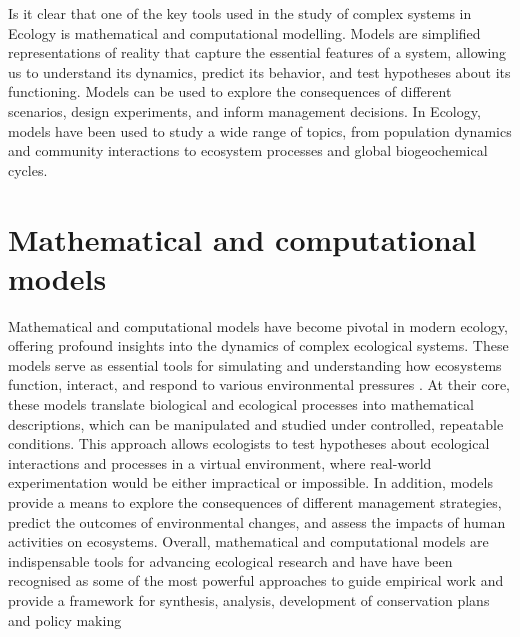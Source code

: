 Is it clear that one of the key tools used in the study of complex systems in
Ecology is mathematical and computational modelling. Models are simplified
representations of reality that capture the essential features of a system,
allowing us to understand its dynamics, predict its behavior, and test
hypotheses about its functioning. Models can be used to explore the
consequences of different scenarios, design experiments, and inform management
decisions. In Ecology, models have been used to study a wide range of topics,
from population dynamics and community interactions to ecosystem processes and
global biogeochemical cycles.

\section{\label{sec:Mathematical and computational models} Mathematical and
  computational models}

Mathematical and computational models have become pivotal in modern ecology,
offering profound insights into the dynamics of complex ecological systems.
These models serve as essential tools for simulating and understanding how
ecosystems function, interact, and respond to various environmental pressures
\cite{HOCH19983}. At their core, these models translate biological and
ecological processes into mathematical descriptions, which can be manipulated
and studied under controlled, repeatable conditions. This approach allows
ecologists to test hypotheses about ecological interactions and processes in a
virtual environment, where real-world experimentation would be either
impractical or impossible. In addition, models provide a means to explore the
consequences of different management strategies, predict the outcomes of
environmental changes, and assess the impacts of human activities on
ecosystems. Overall, mathematical and computational models are indispensable
tools for advancing ecological research and have have been recognised as some
of the most powerful approaches to guide empirical work and provide a framework
for synthesis, analysis, development of conservation plans and policy making
\cite{levin1992mathematics,Murray_book,sarkar2006biodiversity}

